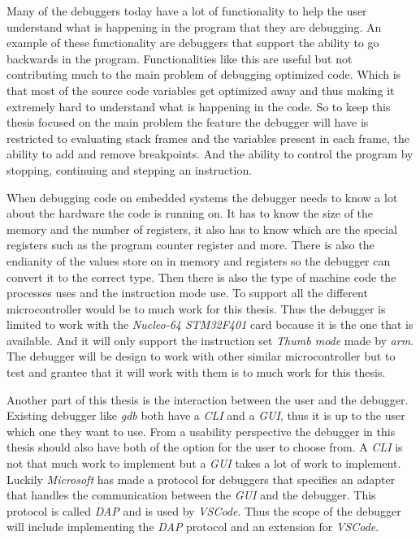Many of the debuggers today have a lot of functionality to help the user understand what is happening in the program that they are debugging.
An example of these functionality are debuggers that support the ability to go backwards in the program.
Functionalities like this are useful but not contributing much to the main problem of debugging optimized code.
Which is that most of the source code variables get optimized away and thus making it extremely hard to understand what is happening in the code.
So to keep this thesis focused on the main problem the feature the debugger will have is restricted to evaluating stack frames and the variables present in each frame, the ability to add and remove breakpoints.
And the ability to control the program by stopping, continuing and stepping an instruction.


When debugging code on embedded systems the debugger needs to know a lot about the hardware the code is running on.
It has to know the size of the memory and the number of registers, it also has to know which are the special registers such as the program counter register and more.
There is also the endianity of the values store on in memory and registers so the debugger can convert it to the correct type.
Then there is also the type of machine code the processes uses and the instruction mode use.
To support all the different microcontroller would be to much work for this thesis.
Thus the debugger is limited to work with the \emph{Nucleo-64 STM32F401} card because it is the one that is available.
And it will only support the instruction set \emph{Thumb mode} made by \emph{arm}.
The debugger will be design to work with other similar microcontroller but to test and grantee that it will work with them is to much work for this thesis.


Another part of this thesis is the interaction between the user and the debugger.
Existing debugger like \emph{gdb} both have a \emph{CLI} and a \emph{GUI}, thus it is up to the user which one they want to use.
From a usability perspective the debugger in this thesis should also have both of the option for the user to choose from.
A \emph{CLI} is not that much work to implement but a \emph{GUI} takes a lot of work to implement.
Luckily \emph{Microsoft} has made a protocol for debuggers that specifies an adapter that handles the communication between the \emph{GUI} and the debugger.
This protocol is called \emph{DAP} and is used by \emph{VSCode}.
Thus the scope of the debugger will include implementing the \emph{DAP} protocol and an extension for \emph{VSCode}.


